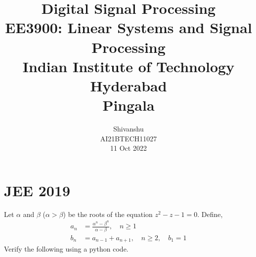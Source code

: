 \documentclass[journal,12pt,twocolumn]{IEEEtran}
\numberwithin{equation}{section}
\begin{document}
                             
\title{ Digital Signal Processing \\ \Large EE3900: Linear Systems and Signal Processing \\ \large Indian Institute of Technology Hyderabad \\ \vspace*{12pt} \textbf{Pingala}}
\author{Shivanshu \\ \normalsize AI21BTECH11027 \\ \vspace*{20pt} \normalsize 11 Oct 2022  }
 \maketitle 
 \tableofcontents 
\section{JEE 2019}
\noindent Let $\alpha$ and $\beta$ ($\alpha > \beta$) be the roots of the
equation $z^2 - z - 1 = 0$. Define,
\begin{align}
	a_n &= \frac{\alpha^{n}-\beta^{n}}{\alpha - \beta}, \quad n \ge 1
	\\
	b_n &= a_{n-1} + a_{n+1}, \quad n \ge 2, \quad b_1 =1
	\label{eq:10-orig-diff}
\end{align}
Verify the following using a python code.
\end{document}

